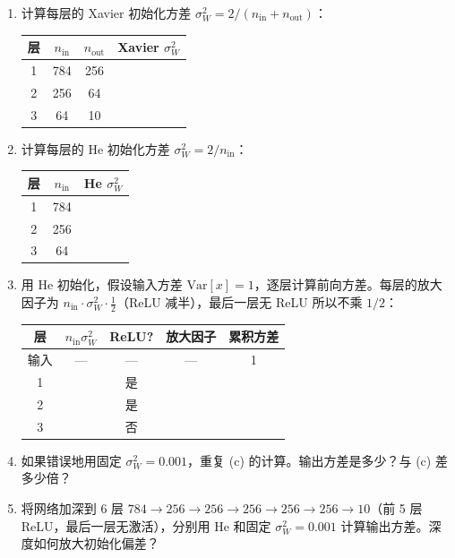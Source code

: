 \documentclass[12pt, a4paper]{ctexart}
\begin{document}
\begin{enumerate}
    \item[(a)] 计算每层的 Xavier 初始化方差 $\sigma_W^2 = 2/(n_{\text{in}}+n_{\text{out}})$：
    \begin{center}
    \begin{tabular}{c|ccc}
    层 & $n_{\text{in}}$ & $n_{\text{out}}$ & Xavier $\sigma_W^2$ \\
    \hline
    1 & 784 & 256 & \\
    2 & 256 & 64 & \\
    3 & 64 & 10 & \\
    \end{tabular}
    \end{center}
    
    \item[(b)] 计算每层的 He 初始化方差 $\sigma_W^2 = 2/n_{\text{in}}$：
    \begin{center}
    \begin{tabular}{c|cc}
    层 & $n_{\text{in}}$ & He $\sigma_W^2$ \\
    \hline
    1 & 784 & \\
    2 & 256 & \\
    3 & 64 & \\
    \end{tabular}
    \end{center}
    
    \item[(c)] 用 He 初始化，假设输入方差 $\text{Var}[x] = 1$，逐层计算前向方差。每层的放大因子为 $n_{\text{in}} \cdot \sigma_W^2 \cdot \frac{1}{2}$（ReLU 减半），最后一层无 ReLU 所以不乘 $1/2$：
    \begin{center}
    \begin{tabular}{c|cccc}
    层 & $n_{\text{in}} \sigma_W^2$ & ReLU? & 放大因子 & 累积方差 \\
    \hline
    输入 & — & — & — & 1 \\
    1 & & 是 & & \\
    2 & & 是 & & \\
    3 & & 否 & & \\
    \end{tabular}
    \end{center}
    
    \item[(d)] 如果错误地用固定 $\sigma_W^2 = 0.001$，重复 (c) 的计算。输出方差是多少？与 (c) 差多少倍？
    
    \item[(e)] 将网络加深到 6 层 $784 \to 256 \to 256 \to 256 \to 256 \to 256 \to 10$（前 5 层 ReLU，最后一层无激活），分别用 He 和固定 $\sigma_W^2 = 0.001$ 计算输出方差。深度如何放大初始化偏差？
\end{enumerate}
\end{document}
